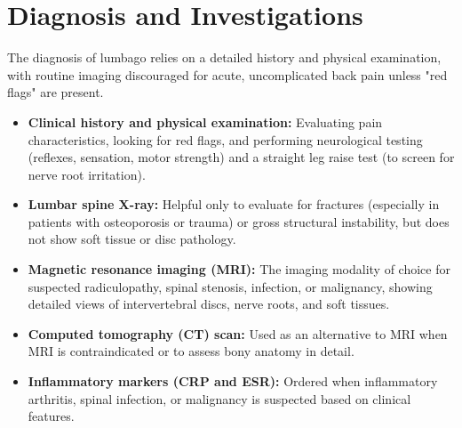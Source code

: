 \section*{Diagnosis and Investigations}
The diagnosis of lumbago relies on a detailed history and physical examination, with routine imaging discouraged for acute, uncomplicated back pain unless "red flags" are present.
\begin{itemize}
    \item \textbf{Clinical history and physical examination:} Evaluating pain characteristics, looking for red flags, and performing neurological testing (reflexes, sensation, motor strength) and a straight leg raise test (to screen for nerve root irritation).
    \item \textbf{Lumbar spine X-ray:} Helpful only to evaluate for fractures (especially in patients with osteoporosis or trauma) or gross structural instability, but does not show soft tissue or disc pathology.
    \item \textbf{Magnetic resonance imaging (MRI):} The imaging modality of choice for suspected radiculopathy, spinal stenosis, infection, or malignancy, showing detailed views of intervertebral discs, nerve roots, and soft tissues.
    \item \textbf{Computed tomography (CT) scan:} Used as an alternative to MRI when MRI is contraindicated or to assess bony anatomy in detail.
    \item \textbf{Inflammatory markers (CRP and ESR):} Ordered when inflammatory arthritis, spinal infection, or malignancy is suspected based on clinical features.
\end{itemize}

